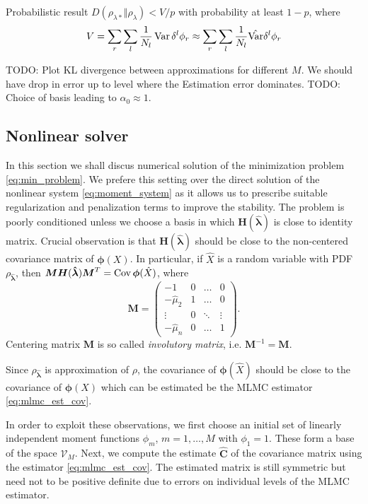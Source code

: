 \documentclass{article}
\def\vc#1{\mathbf{\boldsymbol{#1}}}     %
\def\tn#1{\boldsymbol{#1}}
\def\todo#1{{\color{red}TODO: #1}}
\def\Var{\mathop{\rm Var}}
\def\Cov{\mathop{\rm Cov}}
\def\estvl{{\vc{\hat\lambda}}}
\def\vphi{\vc\phi}
\begin{document}
Probabilistic result $D(\rho_{\lambda*} \Vert \rho_{\lambda}) < V/p$
with probability at least $1-p$, where 
\[
    V = \sum_r \sum_l \frac{1}{N_l} \Var \delta^l\phi_r \approx \sum_r \sum_l \frac{1}{N_l} \hat{\Var} \delta^l\phi_r 
\]

\todo{Plot KL divergence between approximations for different $M$. We should have drop in error up to level where the Estimation error dominates.}
\todo{Choice of basis leading to $\alpha_0 \approx 1$.}

\subsection{Nonlinear solver}

In this section we shall discus numerical solution of the minimization problem \eqref{eq:min_problem}. We prefere this setting over the direct solution of the nonlinear system \eqref{eq:moment_system} as it allows us to prescribe suitable regularization and penalization terms to improve the stability.
The problem is poorly conditioned unless we choose a basis in which $\tn H(\estvl)$ is close to identity matrix. Crucial observation is that $\tn H(\estvl)$ should be close to the non-centered 
covariance matrix of  $\vphi(X)$. In particular, if $\hat X$ is a random variable with PDF $\rho_{\estvl}$, then $\tn M \tn H(\estvl) \tn M^T = \Cov \vphi(\hat X)$, where 
\[
  \tn M = 
  \begin{pmatrix}
    -1    & 0 &\dots &0\\
    -\hat\mu_2    & 1 &\dots &0\\
    \vdots& 0 &\ddots      &\vdots\\
    -\hat\mu_n    & 0 &\dots &1
  \end{pmatrix}.
\]
Centering matrix $\tn M$ is so called \emph{involutory matrix}, i.e. $\tn M^{-1} = \tn M$.


Since $\rho_{\estvl}$ is approximation of $\rho$, the covariance of $\vphi(\hat X)$ should be close to the covariance of $\vphi(X)$ which can be estimated be the MLMC estimator \eqref{eq:mlmc_est_cov}.

In order to exploit these observations, we first choose an initial set of linearly independent 
moment functions $\phi_m$, $m=1,\dots,M$ with $\phi_1=1$. These form a base of the space $\mathcal V_M$.
Next, we compute the estimate $\hat{\tn C}$ of the covariance matrix using the estimator \eqref{eq:mlmc_est_cov}. The estimated matrix is still symmetric but need not to be positive definite
due to errors on individual levels of the MLMC estimator. 
\end{document}
